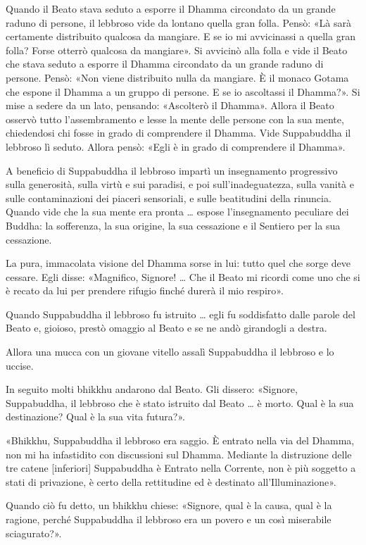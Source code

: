 Quando il Beato stava seduto a esporre il Dhamma circondato da un grande
raduno di persone, il lebbroso vide da lontano quella gran folla. Pensò:
«Là sarà certamente distribuito qualcosa da mangiare. E se io mi
avvicinassi a quella gran folla? Forse otterrò qualcosa da mangiare». Si
avvicinò alla folla e vide il Beato che stava seduto a esporre il Dhamma
circondato da un grande raduno di persone. Pensò: «Non viene distribuito
nulla da mangiare. È il monaco Gotama che espone il Dhamma a un gruppo
di persone. E se io ascoltassi il Dhamma?». Si mise a sedere da un lato,
pensando: «Ascolterò il Dhamma». Allora il Beato osservò tutto
l’assembramento e lesse la mente delle persone con la sua mente,
chiedendosi chi fosse in grado di comprendere il Dhamma. Vide
Suppabuddha il lebbroso lì seduto. Allora pensò: «Egli è in grado di
comprendere il Dhamma».


A beneficio di Suppabuddha il lebbroso impartì un insegnamento
progressivo sulla generosità, sulla virtù e sui paradisi, e poi
sull’inadeguatezza, sulla vanità e sulle contaminazioni dei piaceri
sensoriali, e sulle beatitudini della rinuncia. Quando vide che la sua
mente era pronta … espose l’insegnamento peculiare dei Buddha: la
sofferenza, la sua origine, la sua cessazione e il Sentiero per la sua
cessazione.


La pura, immacolata visione del Dhamma sorse in lui: tutto quel che
sorge deve cessare. Egli disse: «Magnifico, Signore! … Che il Beato mi
ricordi come uno che si è recato da lui per prendere rifugio finché
durerà il mio respiro».


Quando Suppabuddha il lebbroso fu istruito … egli fu soddisfatto dalle
parole del Beato e, gioioso, prestò omaggio al Beato e se ne andò
girandogli a destra.


Allora una mucca con un giovane vitello assalì Suppabuddha il lebbroso e
lo uccise.


In seguito molti bhikkhu andarono dal Beato. Gli dissero: «Signore,
Suppabuddha, il lebbroso che è stato istruito dal Beato … è morto. Qual
è la sua destinazione? Qual è la sua vita futura?».


«Bhikkhu, Suppabuddha il lebbroso era saggio. È entrato nella via del
Dhamma, non mi ha infastidito con discussioni sul Dhamma. Mediante la
distruzione delle tre catene [inferiori] Suppabuddha è Entrato nella
Corrente, non è più soggetto a stati di privazione, è certo della
rettitudine ed è destinato all’Illuminazione».


Quando ciò fu detto, un bhikkhu chiese: «Signore, qual è la causa, qual
è la ragione, perché Suppabuddha il lebbroso era un povero e un così
miserabile sciagurato?».


